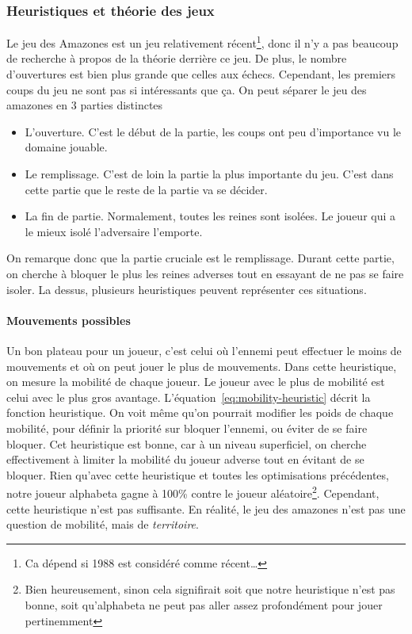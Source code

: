 \subsubsection{Heuristiques et théorie des jeux}
Le jeu des Amazones est un jeu relativement récent\footnote{Ca dépend si 1988 est considéré comme récent\dots},
donc il n'y a pas beaucoup de recherche à propos de la théorie derrière ce jeu.
De plus, le nombre d'ouvertures est bien plus grande que celles aux échecs. Cependant, les premiers coups du jeu
ne sont pas si intéressants que ça. On peut séparer le jeu des amazones en 3 parties distinctes
\begin{itemize}
	\item L'ouverture. C'est le début de la partie, les coups ont peu d'importance vu le domaine jouable.
	\item Le remplissage. C'est de loin la partie la plus importante du jeu. C'est dans
	cette partie que le reste de la partie va se décider.
	\item La fin de partie. Normalement, toutes les reines sont isolées. Le joueur qui a le mieux
	isolé l'adversaire l'emporte.
\end{itemize}

On remarque donc que la partie cruciale est le remplissage. Durant cette partie, on cherche
à bloquer le plus les reines adverses tout en essayant de ne pas se faire isoler. La dessus,
plusieurs heuristiques peuvent représenter ces situations.

\paragraph{Mouvements possibles}
Un bon plateau pour un joueur, c'est celui où l'ennemi peut effectuer le moins de mouvements et
où on peut jouer le plus de mouvements. Dans cette heuristique, on mesure la mobilité
de chaque joueur. Le joueur avec le plus de mobilité est celui avec le plus gros avantage.
L'équation~\ref{eq:mobility-heuristic} décrit la fonction heuristique. On voit
même qu'on pourrait modifier les poids de chaque mobilité, pour définir la priorité sur bloquer l'ennemi, ou éviter de se faire bloquer.
Cet heuristique est bonne, car à un niveau superficiel, on cherche effectivement à limiter
la mobilité du joueur adverse tout en évitant de se bloquer.
Rien qu'avec cette heuristique et toutes les optimisations précédentes, notre joueur alphabeta gagne à 100\% contre le joueur
aléatoire\footnote{Bien heureusement, sinon cela signifirait soit que notre heuristique n'est pas bonne, soit qu'alphabeta ne peut pas aller assez profondément pour jouer pertinemment}.
Cependant, cette heuristique n'est pas suffisante. En réalité, le jeu des amazones n'est pas une question de mobilité,
mais de \emph{territoire}.

